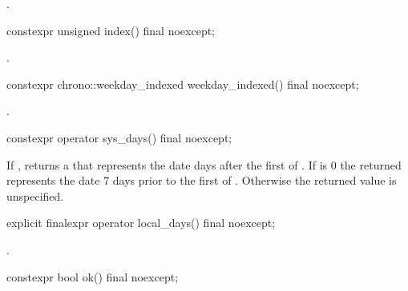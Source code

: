 \begin{itemdescr}
\pnum
\returns {}.
\end{itemdescr}

%
\begin{itemdecl}
constexpr unsigned index() final noexcept;
\end{itemdecl}

\begin{itemdescr}
\pnum
\returns {}.
\end{itemdescr}

%
\begin{itemdecl}
constexpr chrono::weekday_indexed weekday_indexed() final noexcept;
\end{itemdecl}

\begin{itemdescr}
\pnum
\returns {}.
\end{itemdescr}

%
\begin{itemdecl}
constexpr operator sys_days() final noexcept;
\end{itemdecl}

\begin{itemdescr}
\pnum
\returns
If ,
returns a  that
represents the date  days after
the first  of .
If  is 0
the returned 
represents the date 7 days prior to
the first  of .
Otherwise the returned value is unspecified.
\end{itemdescr}

%
\begin{itemdecl}
explicit finalexpr operator local_days() final noexcept;
\end{itemdecl}

\begin{itemdescr}
\pnum
\returns {}.
\end{itemdescr}

%
\begin{itemdecl}
constexpr bool ok() final noexcept;
\end{itemdecl}


